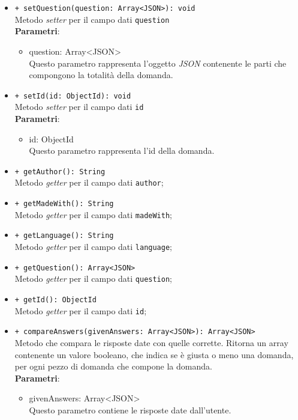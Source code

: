 \begin{itemize}
\begin{itemize}
				\item \texttt{+ setQuestion(question: Array<JSON>): void} \\
				Metodo \textit{setter} per il campo dati \texttt{question}\\
				\textbf{Parametri}:
				\begin{itemize}
					\item {question: Array<JSON>}\\
					Questo parametro rappresenta l'oggetto \textit{JSON} contenente le parti che compongono la totalità della domanda.
				\end{itemize}
				
				\item \texttt{+ setId(id: ObjectId): void} \\
				Metodo \textit{setter} per il campo dati \texttt{id}\\
				\textbf{Parametri}:
				\begin{itemize}
					\item {id: ObjectId}\\
					Questo parametro rappresenta l'id della domanda.
				\end{itemize}
				
				\item \texttt{+ getAuthor(): String} \\
				Metodo \textit{getter} per il campo dati \texttt{author};
				
				\item \texttt{+ getMadeWith(): String} \\
				Metodo \textit{getter} per il campo dati \texttt{madeWith};
				
				\item \texttt{+ getLanguage(): String} \\
				Metodo \textit{getter} per il campo dati \texttt{language};

				\item \texttt{+ getQuestion(): Array<JSON>} \\
				Metodo \textit{getter} per il campo dati \texttt{question};
				
				\item \texttt{+ getId(): ObjectId} \\
				Metodo \textit{getter} per il campo dati \texttt{id};
				
				\item \texttt{+ compareAnswers(givenAnswers: Array<JSON>): Array<JSON>} \\
				Metodo che compara le risposte date con quelle corrette. Ritorna un array contenente un valore booleano, che indica se è giusta o meno una domanda, per ogni pezzo di domanda che compone la domanda. \\
				\textbf{Parametri}:
				\begin{itemize}
					\item {givenAnswers: Array<JSON>}\\
					Questo parametro contiene le risposte date dall'utente. 
				\end{itemize}
				

\end{itemize}
\end{itemize}
